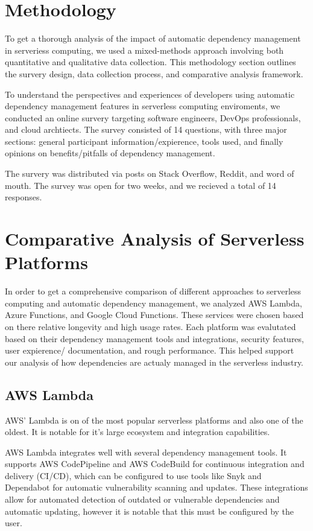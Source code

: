 \documentclass[12pt, letterpaper]{article}
\begin{document}
\section{Methodology}

To get a thorough analysis of the impact of automatic dependency management in serveriess computing, we used a mixed-methods approach involving both quantitative and qualitative data collection. This methodology section outlines the survery design, data collection process, and comparative analysis framework. 

To understand the perspectives and experiences of developers using automatic dependency management features in serverless computing enviroments, we conducted an online survery targeting software engineers, DevOps professionals, and cloud archtiects. The survey consisted of 14 questions, with three major sections: general participant information/expierence, tools used, and finally opinions on benefits/pitfalls of dependency management.

The survery was distributed via posts on Stack Overflow, Reddit, and word of mouth. The survey was open for two weeks, and we recieved a total of 14 responses. 

\section{Comparative Analysis of Serverless Platforms}

In order to get a comprehensive comparison of different approaches to serverless computing and automatic dependency management, we analyzed AWS Lambda, Azure Functions, and Google Cloud Functions. These services were chosen based on there relative longevity and high usage rates. Each platform was evalutated based on their dependency management tools and integrations, security features, user expierence/ documentation, and rough performance. This helped support our analysis of how dependencies are actualy managed in the serverless industry.

\subsection{AWS Lambda}

AWS' Lambda is on of the most popular serverless platforms and also one of the oldest. It is notable for it's large ecosystem and integration capabilities.

AWS Lambda integrates well with several dependency management tools. It supports AWS CodePipeline and AWS CodeBuild for continuous integration and delivery (CI/CD), which can be configured to use tools like Snyk and Dependabot for automatic vulnerability scanning and updates. These integrations allow for automated detection of outdated or vulnerable dependencies and automatic updating, however it is notable that this must be configured by the user.
\end{document}
